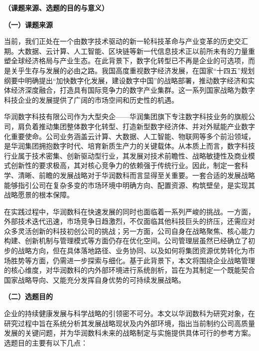 \documentclass[UTF8, a4paper, 11pt]{ctexart}
\begin{document}
\clearpage
\setcounter{page}{2}

\begin{UnifiedBox}
\setlength{\parindent}{2em}

\noindent \textbf{（课题来源、选题的目的与意义）}

\vspace{0.2cm}
\noindent \textbf{（一）课题来源}

\vspace{0.2cm}
当前，我们正处在一个由数字技术驱动的新一轮科技革命与产业变革的历史交汇期。大数据、云计算、人工智能、区块链等新一代信息技术正以前所未有的力量重塑全球经济格局与产业生态。在此背景下，数字化转型已不再是企业的可选项，而是关乎生存与发展的必由之路。我国高度重视数字经济发展，在国家“十四五”规划纲要中明确提出“加快数字化发展，建设数字中国”的战略部署，推动数字经济和实体经济深度融合，打造具有国际竞争力的数字产业集群。这一系列国家战略为数字科技企业的发展提供了广阔的市场空间和历史性的机遇。

华润数字科技有限公司作为大型央企——华润集团旗下专注数字科技业务的旗舰公司，肩负着推动集团整体数字化转型、打造新型数字经济体、并对外赋能产业数字化重要使命。公司业务涵盖云计算、大数据、人工智能、物联网等多个前沿领域，是华润集团拥抱数字时代、培育新质生产力的关键载体。从本质上而言，数字科技行业属于技术密集、创新驱动型行业，其发展对技术前瞻性、战略敏捷性及商业模式创新性的要求极高，其对核心竞争力的依赖强于传统行业。因此，制定一套科学、清晰、前瞻的发展战略对于华润数科而言显得至关重要。一套合适的发展战略能够指引公司在复杂多变的市场环境中明确方向、配置资源、构筑壁垒，是实现其战略愿景的根本保障。

在实践过程中，华润数科在快速发展的同时也面临着一系列严峻的挑战。一方面，外部技术迭代迅速，市场竞争日趋激烈，不仅面临其他科技巨头的挤压，还需应对众多灵活创新的科技初创公司的挑战；另一方面，公司自身在战略聚焦、核心能力构建、创新机制与管理模式等方面仍存在优化空间。公司管理层虽然已经确立了初步的战略方向，但在具体落地路径、业务协同、以及如何将集团资源优势转化为市场胜势等方面，仍需进一步探索与细化。基于此背景下，本文将围绕企业战略管理的核心维度，对华润数科的内外部环境进行系统剖析，旨在为其制定一个既能契合国家战略导向、又能充分发挥自身优势的可持续发展战略。

\vspace{0.3cm}
\noindent \textbf{（二）选题目的}

\vspace{0.2cm}
企业的持续健康发展与科学战略的引领密不可分。本文以华润数科为研究对象，在研究过程中旨在系统分析其发展战略现状及内外部环境，指出当前制约公司高质量发展的关键问题，并为华润数科未来的战略制定与实施提供具体可行的参考方案。选题目的主要有以下几点：


\end{UnifiedBox}
\end{document}
